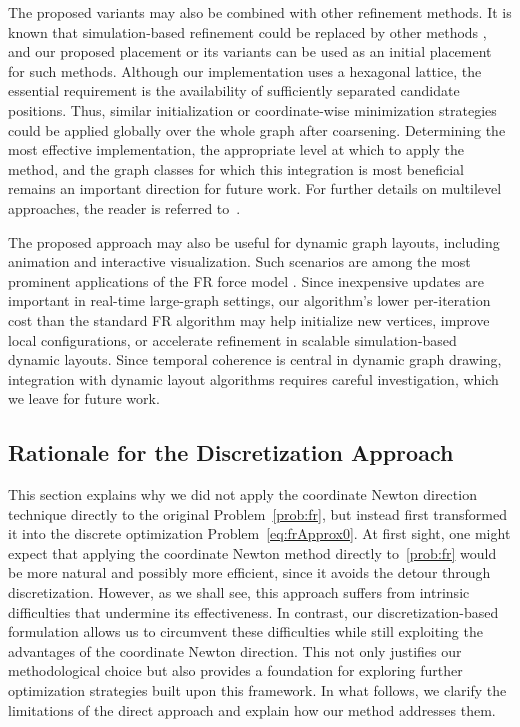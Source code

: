 \documentclass{jgaa-art}
\begin{document}
The proposed variants may also be combined with other refinement methods.
It is known that simulation-based refinement could be replaced by other methods \citep{walshawMultilevelAlgorithmForceDirected2003}, and our proposed placement or its variants can be used as an initial placement for such methods.
Although our implementation uses a hexagonal lattice, the essential requirement is the availability of sufficiently separated candidate positions.
Thus, similar initialization or coordinate-wise minimization strategies could be applied globally over the whole graph after coarsening.
Determining the most effective implementation, the appropriate level at which to apply the method, and the graph classes for which this integration is most beneficial remains an important direction for future work.
For further details on multilevel approaches, the reader is referred to~\citep{arleoMultilevelApproachEventBased2021}.



The proposed approach may also be useful for dynamic graph layouts, including animation and interactive visualization. Such scenarios are among the most prominent applications of the FR force model \citep{ertenGraphAELGraphAnimations2004,frishmanOnlineDynamicGraph2008}.
Since inexpensive updates are important in real-time large-graph settings, our algorithm's lower per-iteration cost than the standard FR algorithm may help initialize new vertices, improve local configurations, or accelerate refinement in scalable simulation-based dynamic layouts.
Since temporal coherence is central in dynamic graph drawing, integration with dynamic layout algorithms requires careful investigation, which we leave for future work.


\subsection{Rationale for the Discretization Approach}
\label{sec:rationale}

This section explains why we did not apply the coordinate Newton direction technique directly to the original Problem~\eqref{prob:fr}, but instead first transformed it into the discrete optimization Problem~\eqref{eq:frApprox0}.
At first sight, one might expect that applying the coordinate Newton method directly to~\eqref{prob:fr} would be more natural and possibly more efficient, since it avoids the detour through discretization.
However, as we shall see, this approach suffers from intrinsic difficulties that undermine its effectiveness.
In contrast, our discretization-based formulation allows us to circumvent these difficulties while still exploiting the advantages of the coordinate Newton direction.
This not only justifies our methodological choice but also provides a foundation for exploring further optimization strategies built upon this framework.
In what follows, we clarify the limitations of the direct approach and explain how our method addresses them.
\end{document}
